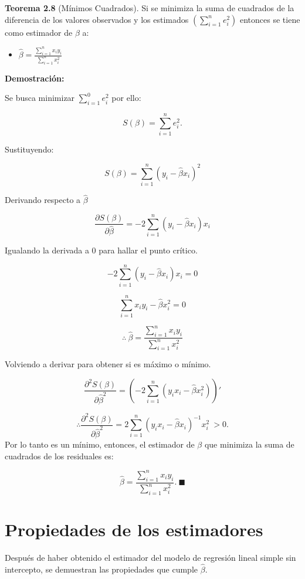 \documentclass[a4paper,oneside,openany]{book}
\providecommand{\tightlist}{%
  \setlength{\itemsep}{0pt}\setlength{\parskip}{0pt}}
\begin{document}
\textbf{Teorema 2.8} (Mínimos Cuadrados). Si se minimiza la suma de
cuadrados de la diferencia de los valores observados y los estimados
\(\left(\sum_{i=1}^{n}e_{i}^2\right)\) entonces se tiene como estimador
de \(\beta\) a:

\begin{itemize}
\tightlist
\item
  \(\hat{\beta}=\frac{\sum_{i=1}^{n}x_{i}y_{i}}{\sum_{i=1}^{n}x_{i}^2}\)
\end{itemize}

\textbf{Demostración:}

Se busca minimizar \(\sum_{i=1}^{0}e_{i}^2\) por ello:

\[S(\beta)=\sum_{i=1}^{n}e_{i}^2.\]

Sustituyendo:

\[S(\beta)=\sum_{i=1}^{n}\left( y_{i}-\hat{\beta}x_{i}\right)^2\]

Derivando respecto a \(\hat{\beta}\)

\[\frac{\partial S(\beta)}{\partial \hat{\beta}}=-2\sum_{i=1}^{n}\left(y_{i}-\hat{\beta}x_{i}\right)x_{i}\]

Igualando la derivada a 0 para hallar el punto crítico.

\[-2\sum_{i=1}^{n}\left(y_{i}-\hat{\beta}x_{i}\right)x_{i}=0\]

\[\sum_{i=1}^{n}x_{i}y_{i}-\hat{\beta}x_{i}^2=0\]

\[\therefore \ \hat{\beta}=\frac{\sum_{i=1}^{n}x_{i}y_{i}}{\sum_{i=1}^{n}x_{i}^2}\]

Volviendo a derivar para obtener si es máximo o mínimo.

\[\frac{\partial^2 S(\beta)}{\partial \hat{\beta}^2}=\left(-2\sum_{i=1}^{n}\left(y_{i}x_{i}-\hat{\beta}x_{i}^2\right)\right)'\]

\[\therefore \frac{\partial^2 S(\beta)}{\partial \hat{\beta}^2}=2\sum_{i=1}^{n}\left(y_{i}x_{i}-\hat{\beta}x_{i}\right)^{-1}x_{i}^2 \ > 0.\]
Por lo tanto es un mínimo, entonces, el estimador de \(\beta\) que
minimiza la suma de cuadrados de los residuales es:

\[\hat{\beta}=\frac{\sum_{i=1}^{n}x_{i}y_{i}}{\sum_{i=1}^{n}x_{i}^2}. \ \blacksquare\]

\section{Propiedades de los
estimadores}\label{propiedades-de-los-estimadores-1}

Después de haber obtenido el estimador del modelo de regresión lineal
simple sin intercepto, se demuestran las propiedades que cumple
\(\hat{\beta}.\)
\end{document}
